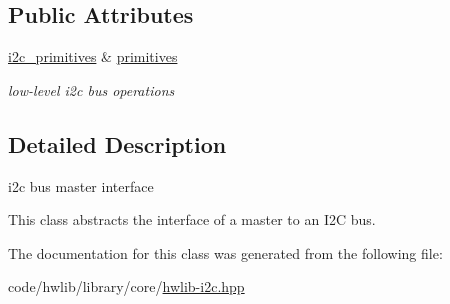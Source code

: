 \subsection*{Public Attributes}
\begin{DoxyCompactItemize}
\item 
\mbox{\label{classhwlib_1_1i2c__bus_a676f1d61bce4122a7d446a42f749d567}} 
\hyperlink{classhwlib_1_1i2c__primitives}{i2c\+\_\+primitives} \& \hyperlink{classhwlib_1_1i2c__bus_a676f1d61bce4122a7d446a42f749d567}{primitives}
\begin{DoxyCompactList}\small\item\em low-\/level i2c bus operations \end{DoxyCompactList}\end{DoxyCompactItemize}


\subsection{Detailed Description}
i2c bus master interface

This class abstracts the interface of a master to an I2C bus. 

The documentation for this class was generated from the following file\+:\begin{DoxyCompactItemize}
\item 
code/hwlib/library/core/\hyperlink{hwlib-i2c_8hpp}{hwlib-\/i2c.\+hpp}\end{DoxyCompactItemize}
